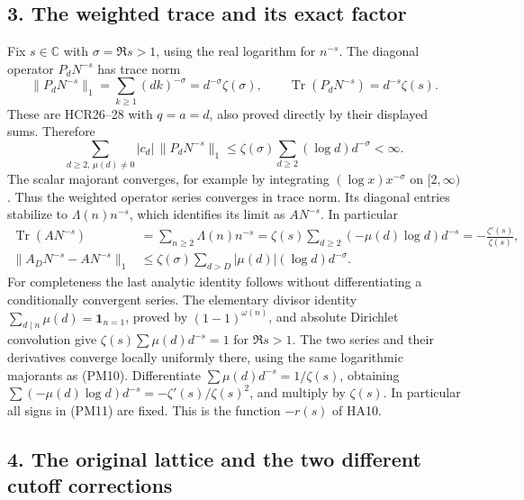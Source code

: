 \documentclass[
  10pt,
  a4paper,
]{article}
\begin{document}
\subsection{3. The weighted trace and its exact
factor}\label{the-weighted-trace-and-its-exact-factor}

Fix \(s\in\mathbb C\) with \(\sigma=\Re s>1\), using the real logarithm
for \(n^{-s}\). The diagonal operator \(P_dN^{-s}\) has trace norm \[
\|P_dN^{-s}\|_1=\sum_{k\ge1}(dk)^{-\sigma}
=d^{-\sigma}\zeta(\sigma),\qquad
\operatorname{Tr}(P_dN^{-s})=d^{-s}\zeta(s).
\tag{PM9}
\] These are HCR26--28 with \(q=a=d\), also proved directly by their
displayed sums. Therefore \[
\sum_{d\ge2,\,\mu(d)\ne0}|c_d|\,\|P_dN^{-s}\|_1
\le\zeta(\sigma)\sum_{d\ge2}(\log d)d^{-\sigma}<\infty.
\tag{PM10}
\] The scalar majorant converges, for example by integrating
\((\log x)x^{-\sigma}\) on \([2,\infty)\). Thus the weighted operator
series converges in trace norm. Its diagonal entries stabilize to
\(\Lambda(n)n^{-s}\), which identifies its limit as \(AN^{-s}\). In
particular \[
\begin{split}
\operatorname{Tr}(AN^{-s})
&=\sum_{n\ge2}\Lambda(n)n^{-s}
=\zeta(s)\sum_{d\ge2}(-\mu(d)\log d)d^{-s}
=-\frac{\zeta'(s)}{\zeta(s)},\\
\|A_DN^{-s}-AN^{-s}\|_1
&\le\zeta(\sigma)\sum_{d>D}|\mu(d)|(\log d)d^{-\sigma}.
\end{split}
\tag{PM11}
\] For completeness the last analytic identity follows without
differentiating a conditionally convergent series. The elementary
divisor identity \(\sum_{d\mid n}\mu(d)=\mathbf1_{n=1}\), proved by
\((1-1)^{\omega(n)}\), and absolute Dirichlet convolution give
\(\zeta(s)\sum\mu(d)d^{-s}=1\) for \(\Re s>1\). The two series and their
derivatives converge locally uniformly there, using the same logarithmic
majorants as (PM10). Differentiate \(\sum\mu(d)d^{-s}=1/\zeta(s)\),
obtaining \(\sum(-\mu(d)\log d)d^{-s}=-\zeta'(s)/\zeta(s)^2\), and
multiply by \(\zeta(s)\). In particular all signs in (PM11) are fixed.
This is the function \(-r(s)\) of HA10.

\subsection{4. The original lattice and the two different cutoff
corrections}\label{the-original-lattice-and-the-two-different-cutoff-corrections}
\end{document}
